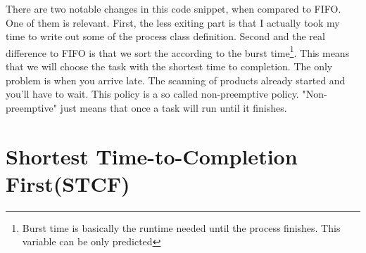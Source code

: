 \documentclass{report}
\newcounter{defi}[section]\setcounter{defi}{0}
\begin{document}
There are two notable changes in this code snippet, when compared to FIFO. One of them is relevant.
First, the less exiting part is that I actually took my time to write out some of the process class definition.
Second and the real difference to FIFO is that we sort the according to the burst time\footnote{Burst time is basically the runtime needed until the process finishes. This variable can be only predicted}. 
This means that we will choose the task with the shortest time to completion.
The only problem is when you arrive late. The scanning of products already started and you'll have to wait.
This policy is a so called non-preemptive policy.
"Non-preemptive" just means that once a task will run until it finishes.


\section{Shortest Time-to-Completion First(STCF)}
\end{document}
